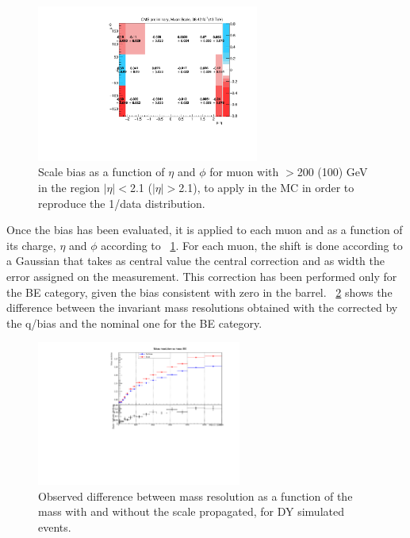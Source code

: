 \begin{figure}[htbp]
\centering
\includegraphics[width=0.65\textwidth]{Images/Cap5/ScaleMap.pdf}
\caption{Scale bias as a function of $\eta$ and $\phi$ for muon with
  \pt $>$200 (100) GeV in the region $|\eta|<$2.1 ($|\eta|>$2.1), to apply in the MC in order to reproduce the 1/\pt  data distribution.}
\label{fig:scale_matrix}
\end{figure}

Once the bias has been evaluated, it is applied to each muon and as a function of its charge, $\eta$ and $\phi$ according to \figurename~\ref{fig:scale_matrix}. For each muon, the shift is done according to a Gaussian that takes as central value the central correction and as width the error assigned on the measurement. This correction has been performed only for the BE category, given the \pt bias consistent with zero in the barrel. \figurename~\ref{fig:MCScaleshift} shows the difference between the invariant mass resolutions obtained with the \pt corrected by the q/\pt bias and the nominal one for the BE category.  

\begin{figure}[htbp]
\centering
\includegraphics[width=0.6\textwidth]{Images/Cap5/BE_vs_Mass.pdf}
\caption{Observed difference between mass resolution as a function of the mass with and without the \pt
  scale propagated, for DY simulated events.
  }
\label{fig:MCScaleshift}
\end{figure}

